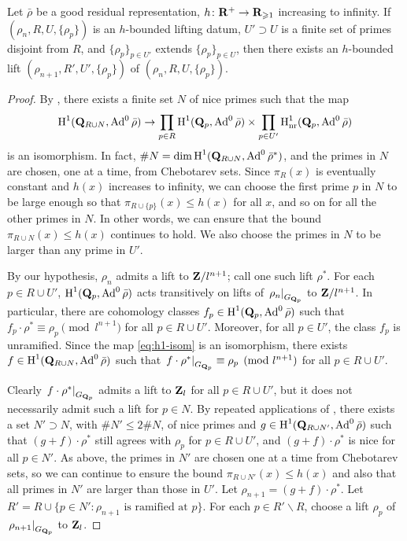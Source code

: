 \begin{theorem}\label{thm:lifting-datum}
Let $\bar\rho$ be a good residual representation, 
$h\colon \mathbf{R}^+ \to \mathbf{R}_{\geqslant 1}$ 
increasing to infinity. If $(\rho_n,R,U,\{\rho_p\})$ is an $h$-bounded lifting 
datum, $U'\supset U$ is a finite set of primes disjoint from $R$, and 
$\{\rho_p\}_{p\in U'}$ extends $\{\rho_p\}_{p\in U}$, then there exists an 
$h$-bounded lift $(\rho_{n+1},R',U',\{\rho_p\})$ of 
$(\rho_n,R,U,\{\rho_p\})$. 
\end{theorem}
\begin{proof}
By \cite[Lem.~8]{khare-larsen-ramakrishna-2005}, there exists a finite set 
$N$ of nice primes such that the map 
\begin{equation}\label{eq:h1-isom}
	\operatorname{H}^1(\mathbf{Q}_{R\cup N},\operatorname{Ad}^0\bar\rho) \to \prod_{p\in R} \operatorname{H}^1(\mathbf{Q}_p,\operatorname{Ad}^0\bar\rho) \times \prod_{p\in U'} \operatorname{H}_{\mathrm{nr}}^1(\mathbf{Q}_p,\operatorname{Ad}^0\bar\rho) 
\end{equation}
is an isomorphism. In fact, 
$\# N = \dim\operatorname{H}^1(\mathbf{Q}_{R\cup N},\operatorname{Ad}^0\bar\rho^\ast)$, and the primes in $N$ are 
chosen, one at a time, from Chebotarev sets. Since $\pi_R(x)$ is eventually 
constant and $h(x)$ increases to infinity, we can choose the first prime $p$ in 
$N$ to be large enough so that $\pi_{R\cup\{p\}}(x) \leqslant h(x)$ for all 
$x$, and so on for all the other primes in $N$. In other words, we can ensure 
that the bound $\pi_{R\cup N}(x) \leqslant h(x)$ continues to hold. We also 
choose the primes in $N$ to be larger than any prime in $U'$. 

By our hypothesis, $\rho_n$ admits a lift to $\mathbf{Z}/l^{n+1}$; call one such lift 
$\rho^\ast$. For each $p\in R\cup U'$, $\operatorname{H}^1(\mathbf{Q}_p,\operatorname{Ad}^0\bar\rho)$ acts 
transitively on lifts of $\left.\rho_n\right|_{G_{\mathbf{Q}_p}}$ to $\mathbf{Z}/l^{n+1}$. In 
particular, there are cohomology classes $f_p\in \operatorname{H}^1(\mathbf{Q}_p,\operatorname{Ad}^0\bar\rho)$ 
such that $f_p\cdot \rho^\ast \equiv \rho_p\pmod{l^{n+1}}$ for all 
$p\in R\cup U'$. Moreover, for all $p\in U'$, the class $f_p$ is unramified. 
Since the map \eqref{eq:h1-isom} is an isomorphism, there exists 
$f\in \operatorname{H}^1(\mathbf{Q}_{R\cup N},\operatorname{Ad}^0\bar\rho)$ such that 
$\left.f\cdot \rho^\ast\right|_{G_{\mathbf{Q}_p}}\equiv \rho_p\pmod{l^{n+1}}$ for all 
$p\in R\cup U'$. 

Clearly $\left. f\cdot \rho^\ast\right|_{G_{\mathbf{Q}_p}}$ admits a lift to $\mathbf{Z}_l$ 
for all $p\in R\cup U'$, but it does not necessarily admit such a lift for 
$p\in N$. By repeated applications of \cite[Prop.~3.10]{pande-2011}, there 
exists a set $N'\supset N$, with $\# N'\leqslant 2\# N$, of nice primes and 
$g\in \operatorname{H}^1(\mathbf{Q}_{R\cup N'},\operatorname{Ad}^0\bar\rho)$ such that 
$(g+f)\cdot \rho^\ast$ still agrees with $\rho_p$ for $p\in R\cup U'$, and 
$(g+f)\cdot \rho^\ast$ is nice for all $p\in N'$. As above, the primes in $N'$ 
are chosen one at a time from Chebotarev sets, so we can continue to ensure the 
bound $\pi_{R\cup N'}(x)\leqslant h(x)$ and also that all primes in $N'$ 
are larger than those in $U'$. Let $\rho_{n+1} = (g+f) \cdot \rho^\ast$. Let 
$R' = R\cup \{p\in N' : \rho_{n+1}\text{ is ramified at }p\}$. For each 
$p\in R'\smallsetminus R$, choose a lift $\rho_p$ of 
$\left. \rho_{n+1}\right|_{G_{\mathbf{Q}_p}}$ to $\mathbf{Z}_l$. 


\end{proof}
